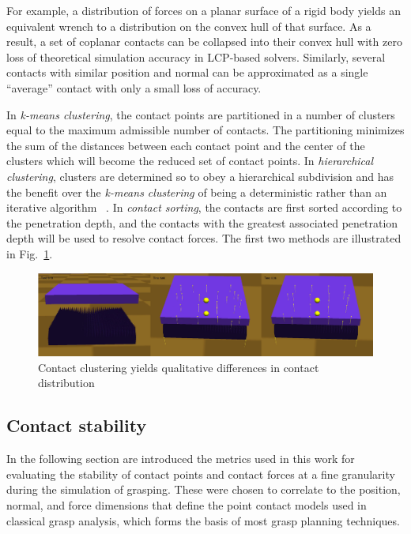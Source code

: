 For example, a distribution of forces on a planar surface of a rigid body yields an equivalent wrench to a distribution on the convex hull of that surface. As a result, a set of coplanar contacts can be collapsed into their convex hull with zero loss of theoretical simulation accuracy in LCP-based solvers.  Similarly, several contacts with similar position and normal can be approximated as a single ``average'' contact with only a small loss of accuracy.

In \emph{k-means clustering}, the contact points are partitioned in a number of clusters equal to the maximum admissible number of contacts. The partitioning minimizes the sum of the distances between each contact point and the center of the clusters which will become the reduced set of contact points.
In \emph{hierarchical clustering}, clusters are determined so to obey a hierarchical subdivision and has the benefit over the \emph{k-means clustering} of being a deterministic rather than an iterative algorithm ~\cite{Rokach10}.
In \emph{contact sorting}, the contacts are first sorted according to the penetration depth, and the contacts with the greatest associated penetration depth will be used to resolve contact forces. The first two methods are illustrated in Fig.~\ref{fig:clustering}.


\begin{figure}[!hbt]
\begin{center}
        \includegraphics[width=0.95\columnwidth]     {images/ssoch/clustering}
        \caption{Contact clustering yields qualitative differences in contact distribution}
        \label{fig:clustering}
        \end{center}
\end{figure}


\subsection{Contact stability}

In the following section are introduced the metrics used in this work for evaluating the stability of contact points and contact forces at a fine granularity during the simulation of grasping.  These were chosen to correlate to the position, normal, and force dimensions that define the point contact models used in classical grasp analysis, which forms the basis of most grasp planning techniques.

